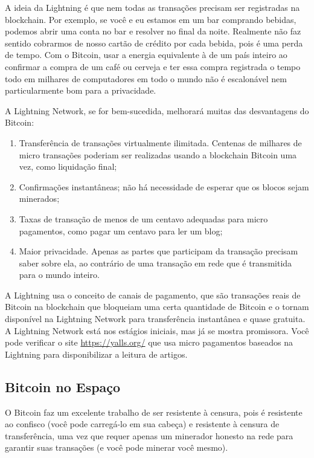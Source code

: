 A ideia da Lightning é que nem todas as transações precisam ser registradas na blockchain.
Por exemplo, se você e eu estamos em um bar comprando bebidas, podemos abrir uma conta no bar e resolver no final da noite. 
Realmente não faz sentido cobrarmos de nosso cartão de crédito por cada bebida, pois é uma perda de tempo.
Com o Bitcoin, usar a energia equivalente à de um país inteiro ao confirmar a compra de um café ou cerveja e ter essa compra registrada o tempo todo em milhares de computadores em todo o mundo não é escalonável nem particularmente bom para a privacidade.

A Lightning Network, se for bem-sucedida, melhorará muitas das desvantagens do Bitcoin:

\begin{enumerate}
\item Transferência de transações virtualmente ilimitada. Centenas de milhares de micro transações poderiam ser realizadas usando a blockchain Bitcoin uma vez, como liquidação final;
\item Confirmações instantâneas; não há necessidade de esperar que os blocos sejam minerados;
\item Taxas de transação de menos de um centavo adequadas para micro pagamentos, como pagar um centavo para ler um blog;
\item Maior privacidade. Apenas as partes que participam da transação precisam saber sobre ela, ao contrário de uma transação em rede que é transmitida para o mundo inteiro.
\end{enumerate}

A Lightning usa o conceito de canais de pagamento, que são transações reais de Bitcoin na blockchain que bloqueiam uma certa quantidade de Bitcoin e o tornam disponível na Lightning Network para transferência instantânea e quase gratuita.
A Lightning Network está nos estágios iniciais, mas já se mostra promissora.
Você pode verificar o site \textcolor{red}{\url{https://yalls.org/}} que usa micro pagamentos baseados na Lightning para disponibilizar a leitura de artigos.

\subsection*{Bitcoin no Espaço}

O Bitcoin faz um excelente trabalho de ser resistente à censura, pois é resistente ao confisco (você pode carregá-lo em sua cabeça) e resistente à censura de transferência, uma vez que requer apenas um minerador honesto na rede para garantir suas transações (e você pode minerar você mesmo).

